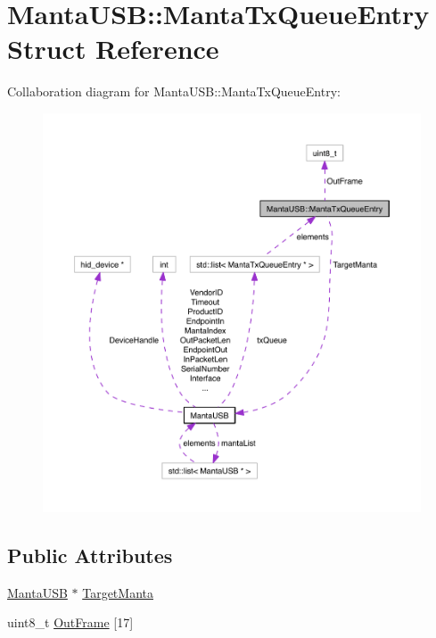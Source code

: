 \hypertarget{structMantaUSB_1_1MantaTxQueueEntry}{\section{\-Manta\-U\-S\-B\-:\-:\-Manta\-Tx\-Queue\-Entry \-Struct \-Reference}
\label{structMantaUSB_1_1MantaTxQueueEntry}
}


\-Collaboration diagram for \-Manta\-U\-S\-B\-:\-:\-Manta\-Tx\-Queue\-Entry\-:\nopagebreak
\begin{figure}[H]
\begin{center}
\leavevmode
\includegraphics[width=350pt]{structMantaUSB_1_1MantaTxQueueEntry__coll__graph}
\end{center}
\end{figure}
\subsection*{\-Public \-Attributes}
\begin{DoxyCompactItemize}
\item 
\hyperlink{classMantaUSB}{\-Manta\-U\-S\-B} $\ast$ \hyperlink{structMantaUSB_1_1MantaTxQueueEntry_ad4263c1f563d395ac02f91c6346217a2}{\-Target\-Manta}
\item 
uint8\-\_\-t \hyperlink{structMantaUSB_1_1MantaTxQueueEntry_acedefcae480fc665cd2d83c38b542edb}{\-Out\-Frame} \mbox{[}17\mbox{]}
\end{DoxyCompactItemize}


